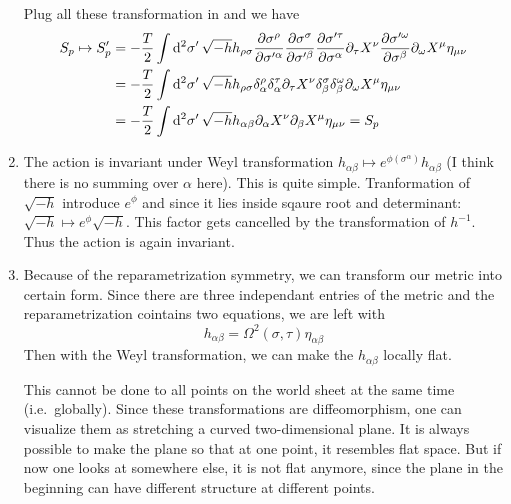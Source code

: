 \begin{enumerate}[label=(\alph*)]
		Plug all these transformation in and we have
		\begin{align}
			S_p \mapsto S'_p &= - \frac{T}{2} \int \dd[2]{\sigma'} \sqrt{-h}  h_{\rho\sigma} \pdv{\sigma^\rho}{\sigma'^\alpha} \pdv{\sigma^\sigma}{\sigma'^\beta} \pdv{\sigma'^\tau}{\sigma^\alpha} \partial_\tau X^\nu \pdv{\sigma'^\omega}{\sigma^\beta} \partial_\omega X^\mu \eta_{\mu\nu} \notag \\
								  &= - \frac{T}{2} \int \dd[2]{\sigma'} \sqrt{-h}  h_{\rho\sigma}  \delta^\rho_\alpha \delta^\tau_\alpha \partial_\tau X^\nu  \delta^\sigma_{\beta} \delta^\omega_\beta \partial_\omega X^\mu  \eta_{\mu\nu} \notag \\
								  &= - \frac{T}{2} \int \dd[2]{\sigma'} \sqrt{-h} h_{\alpha\beta} \partial_\alpha X^\nu \partial_\beta X^\mu  \eta_{\mu\nu} = S_p
		\end{align}
	\item The action is invariant under Weyl transformation $h_{\alpha\beta} \mapsto e^{\phi(\sigma^\alpha)} h_{\alpha\beta}$ (I think there is no summing over $\alpha$ here). This is quite simple. Tranformation of $\sqrt{-h}$ introduce $e^{\phi}$ and since it lies inside sqaure root and determinant: $\sqrt{-h} \mapsto e^{\phi}\sqrt{-h}$. This factor gets cancelled by the transformation of $h^{-1}$. Thus the action is again invariant.
	\item 
		Because of the reparametrization symmetry, we can transform our metric into certain form. Since there are three independant entries of the metric and the reparametrization cointains two equations, we are left with
		\begin{equation}
			h_{\alpha \beta} = \Omega^2(\sigma, \tau) \eta_{\alpha\beta}
		\end{equation}
		Then with the Weyl transformation, we can make the $h_{\alpha \beta} $ locally flat.

		This cannot be done to all points on the world sheet at the same time (i.e.~globally). Since these transformations are diffeomorphism, one can visualize them as stretching a curved two-dimensional plane. It is always possible to make the plane so that at one point, it resembles flat space. But if now one looks at somewhere else, it is not flat anymore, since the plane in the beginning can have different structure at different points.
\end{enumerate}

